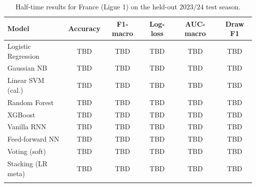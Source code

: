 \documentclass[pdflatex,sn-mathphys-num]{sn-jnl}
\theoremstyle{thmstyleone}
\theoremstyle{thmstyletwo}
\theoremstyle{thmstylethree}
\begin{document}
\begin{table}[h]
\caption{Half-time results for France (Ligue 1) on the held-out
$2023/24$ test season.}\label{tab:ht-fra}
\begin{tabular}{@{}lccccc@{}}
\toprule
Model               & Accuracy & F1-macro & Log-loss & AUC-macro & Draw F1 \\
\midrule
Logistic Regression & TBD & TBD & TBD & TBD & TBD \\
Gaussian NB         & TBD & TBD & TBD & TBD & TBD \\
Linear SVM (cal.)   & TBD & TBD & TBD & TBD & TBD \\
Random Forest       & TBD & TBD & TBD & TBD & TBD \\
XGBoost             & TBD & TBD & TBD & TBD & TBD \\
Vanilla RNN         & TBD & TBD & TBD & TBD & TBD \\
Feed-forward NN     & TBD & TBD & TBD & TBD & TBD \\
\midrule
Voting (soft)       & TBD & TBD & TBD & TBD & TBD \\
Stacking (LR meta)  & TBD & TBD & TBD & TBD & TBD \\
\botrule
\end{tabular}
\end{table}
\end{document}
